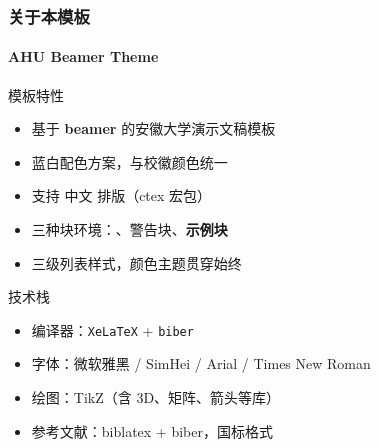 \begin{frame}
\frametitle{关于本模板}
\framesubtitle{AHU Beamer Theme}

\begin{block}{模板特性}
\begin{itemize}
  \item 基于 \textbf{beamer} 的安徽大学演示文稿模板
  \item 蓝白配色方案，与校徽颜色统一
  \item 支持 \alert{中文} 排版（ctex 宏包）
  \item 三种块环境：、\alert{警告块}、\textbf{示例块}
  \item 三级列表样式，颜色主题贯穿始终
\end{itemize}
\end{block}

\begin{exampleblock}{技术栈}
\begin{itemize}
  \item 编译器：\texttt{XeLaTeX} + \texttt{biber}
  \item 字体：微软雅黑 / SimHei / Arial / Times New Roman
  \item 绘图：TikZ（含 3D、矩阵、箭头等库）
  \item 参考文献：biblatex + biber，国标格式
\end{itemize}
\end{exampleblock}
\end{frame}
